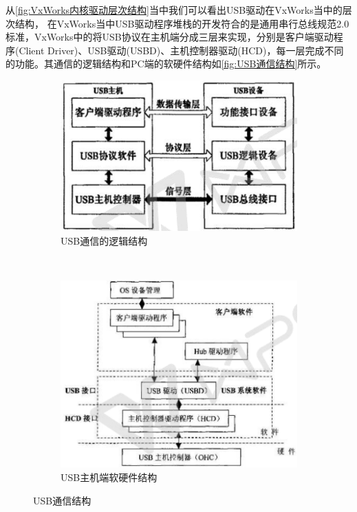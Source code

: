 	从\autoref{fig:VxWorks内核驱动层次结构}当中我们可以看出USB驱动在VxWorks当中的层次结构，		
	在VxWorks当中USB驱动程序堆栈的开发符合的是通用串行总线规范2.0标准，VxWorks中的将USB协议在主机端分成三层来实现，分别是客户端驱动程序(Client Driver)、USB驱动(USBD)、主机控制器驱动(HCD)，每一层完成不同的功能。其通信的逻辑结构和PC端的软硬件结构如\autoref{fig:USB通信结构}所示。
\begin{figure}[h]
\centering
  \begin{subfigure}[b]{0.4\textwidth}
  \includegraphics[width=1.0\textwidth]{./graphics/USB-device-structure-diagram.pdf}
  \caption{USB通信的逻辑结构}\label{fig:usb通信逻辑结构}
  \end{subfigure}
  ~
  \begin{subfigure}[b]{0.5\textwidth}
  \includegraphics[width=1.0\textwidth]{./graphics/USB-PC-structure.pdf}
  \caption{USB主机端软硬件结构}\label{fig:usb-PC}
  \end{subfigure}
\caption{USB通信结构}\label{fig:USB通信结构}
\end{figure}
	
